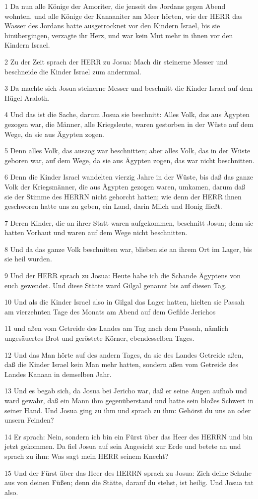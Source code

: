 \par 1 Da nun alle Könige der Amoriter, die jenseit des Jordans gegen Abend wohnten, und alle Könige der Kanaaniter am Meer hörten, wie der HERR das Wasser des Jordans hatte ausgetrocknet vor den Kindern Israel, bis sie hinübergingen, verzagte ihr Herz, und war kein Mut mehr in ihnen vor den Kindern Israel.
\par 2 Zu der Zeit sprach der HERR zu Josua: Mach dir steinerne Messer und beschneide die Kinder Israel zum andernmal.
\par 3 Da machte sich Josua steinerne Messer und beschnitt die Kinder Israel auf dem Hügel Araloth.
\par 4 Und das ist die Sache, darum Josua sie beschnitt: Alles Volk, das aus Ägypten gezogen war, die Männer, alle Kriegsleute, waren gestorben in der Wüste auf dem Wege, da sie aus Ägypten zogen.
\par 5 Denn alles Volk, das auszog war beschnitten; aber alles Volk, das in der Wüste geboren war, auf dem Wege, da sie aus Ägypten zogen, das war nicht beschnitten.
\par 6 Denn die Kinder Israel wandelten vierzig Jahre in der Wüste, bis daß das ganze Volk der Kriegsmänner, die aus Ägypten gezogen waren, umkamen, darum daß sie der Stimme des HERRN nicht gehorcht hatten; wie denn der HERR ihnen geschworen hatte uns zu geben, ein Land, darin Milch und Honig fließt.
\par 7 Deren Kinder, die an ihrer Statt waren aufgekommen, beschnitt Josua; denn sie hatten Vorhaut und waren auf dem Wege nicht beschnitten.
\par 8 Und da das ganze Volk beschnitten war, blieben sie an ihrem Ort im Lager, bis sie heil wurden.
\par 9 Und der HERR sprach zu Josua: Heute habe ich die Schande Ägyptens von euch gewendet. Und diese Stätte ward Gilgal genannt bis auf diesen Tag.
\par 10 Und als die Kinder Israel also in Gilgal das Lager hatten, hielten sie Passah am vierzehnten Tage des Monats am Abend auf dem Gefilde Jerichos
\par 11 und aßen vom Getreide des Landes am Tag nach dem Passah, nämlich ungesäuertes Brot und geröstete Körner, ebendesselben Tages.
\par 12 Und das Man hörte auf des andern Tages, da sie des Landes Getreide aßen, daß die Kinder Israel kein Man mehr hatten, sondern aßen vom Getreide des Landes Kanaan in demselben Jahr.
\par 13 Und es begab sich, da Josua bei Jericho war, daß er seine Augen aufhob und ward gewahr, daß ein Mann ihm gegenüberstand und hatte sein bloßes Schwert in seiner Hand. Und Josua ging zu ihm und sprach zu ihm: Gehörst du uns an oder unsern Feinden?
\par 14 Er sprach: Nein, sondern ich bin ein Fürst über das Heer des HERRN und bin jetzt gekommen. Da fiel Josua auf sein Angesicht zur Erde und betete an und sprach zu ihm: Was sagt mein HERR seinem Knecht?
\par 15 Und der Fürst über das Heer des HERRN sprach zu Josua: Zieh deine Schuhe aus von deinen Füßen; denn die Stätte, darauf du stehst, ist heilig. Und Josua tat also.

